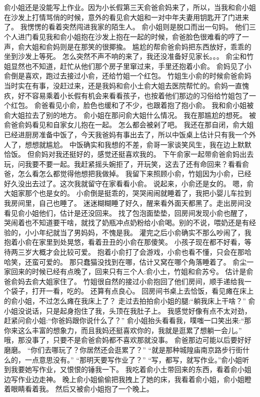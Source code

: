 \chapter{}
俞小姐还是没能写上作业。因为小长假第三天俞爸俞妈来了，所以，当我和俞小姐在沙发上打情骂俏的时候，意外的看见俞大姐和一对中年夫妻用钥匙开了门进来了。
我愣愣的看着突然闯进我家的陌生人。
俞小姐则是脱口而出一句妈。
他们三个人进门看见我和俞小姐抱在沙发上抱在一起的时候，俞爸脸色很难看的哼了一声，俞大姐和俞妈则是在那笑的很揶揄。
尴尬的帮俞爸俞妈把东西放好，乖乖的坐到沙发上等死。
怎么突然不声不响的来了，我还没准备好见家长。。。
俞尘和竹姐显然也不知道，赶忙从他们那个房子里窜过来，手里还抱着小俞。
俞妈见了小俞倒是喜欢，跑过去接过小俞，还给竹姐一个红包。
竹姐生小俞的时候俞爸俞妈当时实在有事，没赶过来，还是我妈和俞小土俞大姐去医院帮忙的。俞妈一直愧疚，好不容易乘着小长假有机会来看看孩子，也按着他们那边的习俗给竹姐包了一个红包。
俞爸看见小俞，脸色也缓和了不少，也跟着抱了抱小俞。
我和俞小姐被俞大姐拉去了别的地方。
俞小姐在那问俞大姐什么情况。
我在那尴尬的想死。
被俞爸俞妈看见和自家女儿抱在一起。
怎么都会被剁了吧。
我还在那自闭，俞大姐已经进厨房准备中饭了，今天我爸妈有事出去了，所以中饭桌上估计只有我一个外人了，想想就尴尬。
中饭确实和我想的不差，俞哥一家谈笑风生，我在边上默默恰饭。
但俞妈对我还挺好的，感觉还挺喜欢我的。
下午俞家一起带俞爸俞妈出去玩，问我要不要一起。我赶紧摇头婉拒了，开玩笑，这去了还有命回来？看看俞爸，怎么看怎么都觉得他想把我做掉。
我留下来照顾小俞，竹姐因为小俞，已经好久没出去过了。这次我就留守在家看看小俞。
说起来，小俞还是女的。
嗯，俞大姐家那个也是女的。
小俞倒是挺乖的，哭哭闹闹就睡着了，我把小婴儿车拉到我房间里，自己也睡了。
迷迷糊糊睡了好久，醒来看外面天都黑了。走出房间没看见俞小姐他们，估计是还没回来。
找了包泡面垫垫，回房间发现小俞也醒了，哭闹着也不知道要干啥，就找了奶瓶冲点奶粉给小俞喝。别的不说，喂奶还是有经验的，小小年纪就当了男妈妈，不愧是我。
灌完之后小俞确实不那么吵闹了，我抱着小俞在家里到处晃悠，看着丑丑的小俞在那傻笑。
小孩子现在都不好看，等待两三岁大概才会比较可爱。
抱着小俞打了会游戏，小俞也看不懂，只会在那哈哈笑，还蛮可爱的。
那只蠢猫没找到在哪，估计又窝在哪个角落睡着了。
俞尘一家回来的时候已经有点晚了，回来只有三个人:俞小土，竹姐和俞苏兮。
估计是俞爸俞妈去俞大姐家住了。
竹姐很自然的接过小俞抱回了他们房间，顺手递给我一个袋子，打开一看，吃的。
还算有点良心。
回房间书桌上去恰饭，看见瘫在床上的俞小姐，不过怎么瘫在我床上了？
走过去拍拍俞小姐的腿:“躺我床上干啥？”
俞小姐没说话，只是起身抱住了我，头顶在我肚子上。
我感觉好像有点不太对劲，赶紧问俞小姐:“你爸妈跟你说什么了？”
俞小姐抬头看看我，噗嗤一口笑出来:“那你来这么丰富的想象力，而且我妈还挺喜欢你的，我就是逛累了想躺一会儿。”
哦，那没事了，只要不是俞爸俞妈都不喜欢那就没事。
俞爸那边可能以后要好好磨磨。
“你们去哪玩了？你居然还会逛累了？”
“就是那种城隍庙南京路步行街什么的，一点意思没有。”
“那明天要写作业了？”
“写，都写，就写作业。”俞小姐听到我要她写作业，又恨恨的锤我一下。
我吃着俞小土带回来的东西，看着俞小姐边写作业边走神。
晚上俞小姐偷偷把我拽上了她的床，我看着俞小姐，俞小姐瞪着眼睛看着我。
然后又被俞小姐抱了一个晚上。

